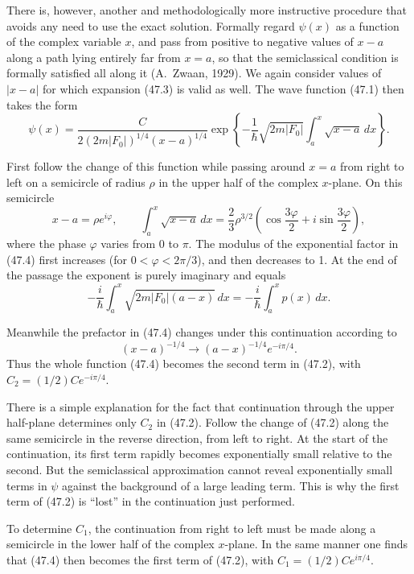 There is, however, another and methodologically more instructive procedure
that avoids any need to use the exact solution. Formally regard $\psi(x)$ as a
function of the complex variable $x$, and pass from positive to negative
values of $x-a$ along a path lying entirely far from $x=a$, so that the
semiclassical condition is formally satisfied all along it (A.~Zwaan, 1929).
We again consider values of $|x-a|$ for which expansion (47.3) is valid as
well. The wave function (47.1) then takes the form
\begin{equation}
  \psi(x)=\frac{C}{2(2m|F_0|)^{1/4}(x-a)^{1/4}}
  \exp\left\{-\frac1\hbar\sqrt{2m|F_0|}
  \int_a^x\sqrt{x-a}\,dx\right\}.
  \tag{47.4}
\end{equation}

First follow the change of this function while passing around $x=a$ from
right to left on a semicircle of radius $\rho$ in the upper half of the
complex $x$-plane. On this semicircle
\[
  x-a=\rho e^{i\varphi},\qquad
  \int_a^x\sqrt{x-a}\,dx=\frac23\rho^{3/2}
  \left(\cos\frac{3\varphi}{2}+i\sin\frac{3\varphi}{2}\right),
\]
where the phase $\varphi$ varies from 0 to $\pi$. The modulus of the
exponential factor in (47.4) first increases (for
$0<\varphi<2\pi/3$), and then decreases to 1. At the end of the passage the
exponent is purely imaginary and equals
\[
  -\frac i\hbar\int_a^x\sqrt{2m|F_0|(a-x)}\,dx
  =-\frac i\hbar\int_a^x p(x)\,dx.
\]

Meanwhile the prefactor in (47.4) changes under this continuation according
to
\[
  (x-a)^{-1/4}\longrightarrow(a-x)^{-1/4}e^{-i\pi/4}.
\]
Thus the whole function (47.4) becomes the second term in (47.2), with
$C_2=(1/2)Ce^{-i\pi/4}$.

There is a simple explanation for the fact that continuation through the
upper half-plane determines only $C_2$ in (47.2). Follow the change of (47.2)
along the same semicircle in the reverse direction, from left to right. At the
start of the continuation, its first term rapidly becomes exponentially small
relative to the second. But the semiclassical approximation cannot reveal
exponentially small terms in $\psi$ against the background of a large leading
term. This is why the first term of (47.2) is ``lost'' in the continuation
just performed.

To determine $C_1$, the continuation from right to left must be made along a
semicircle in the lower half of the complex $x$-plane. In the same manner one
finds that (47.4) then becomes the first term of (47.2), with
$C_1=(1/2)Ce^{i\pi/4}$.

